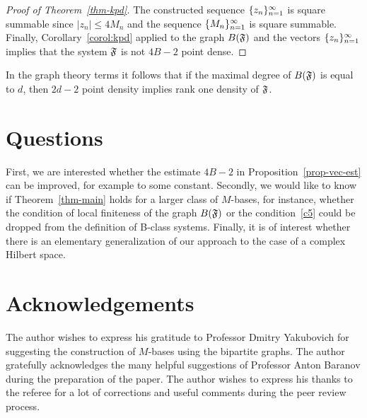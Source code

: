 \documentclass[12pt,oneside,a4paper]{amsart}
\begin{document}
\begin{proof}[Proof of Theorem~\ref{thm-kpd}]
        The constructed sequence $\{{z}_n\}_{n=1}^\infty$ is square summable
          since $\lvert z_n \rvert \leq 4M_n$ and the sequence $\{{M}_n\}_{n=1}^\infty$ is square summable.
        Finally, Corollary~\ref{corol:kpd} applied to the graph $B(\mathfrak{F})$ and the vectors $\{{z}_n\}_{n=1}^\infty$ implies that
          the system $\mathfrak{F}$ is not $4B - 2$ point dense.
      \end{proof}
      \begin{remark*}
        In the graph theory terms it follows that if the maximal degree of $B(\mathfrak{F})$ is equal to $d$,
          then $2d - 2$ point density implies rank one density of $\mathfrak{F}$.
      \end{remark*}
  \bigskip
  \section{Questions}
    First, we are interested whether the estimate $4B - 2$ in Proposition~\eqref{prop-vec-est} can be improved, for example to some constant.
    Secondly, we would like to know if Theorem~\ref{thm-main} holds for a larger class of $M$-bases, for instance, whether the condition of
      local finiteness of the graph $B(\mathfrak{F})$ or the condition~\ref{c5} could be dropped from the definition of B-class systems.
    Finally, it is of interest whether there is an elementary generalization of our approach to the case of a complex Hilbert space.

  \section{Acknowledgements}
    The author wishes to express his gratitude to Professor Dmitry Yakubovich for suggesting
      the construction of $M$-bases using the bipartite graphs.
    The author gratefully acknowledges the many helpful suggestions of
      Professor Anton Baranov during the preparation of the paper.
    The author wishes to express his thanks to the referee for a lot of corrections and useful comments during
      the peer review process.
\end{document}
